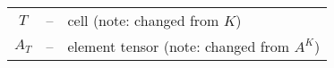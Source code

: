 \documentclass{article}
\begin{document}
\linespread{1.2}

\begin{tabular}{ccl}
  $T$ &--&
  cell (note: changed from $K$) \\
  $A_T$ &--&
  element tensor (note: changed from $A^K$) \\
\end{tabular}
\end{document}
